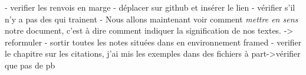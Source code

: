 - verifier les renvois en marge
- déplacer sur github et insérer le lien
- vérifier s'il n'y a pas des  qui trainent
- Nous allons maintenant voir comment \emph{mettre en sens} notre document, c'est à dire comment indiquer  la signification de nos textes. -> reformuler
- sortir toutes les notes situées dans en environnement framed
- verifier le chapitre sur les citations, j'ai mis les exemples dans des fichiers à part->vérifier que pas de pb